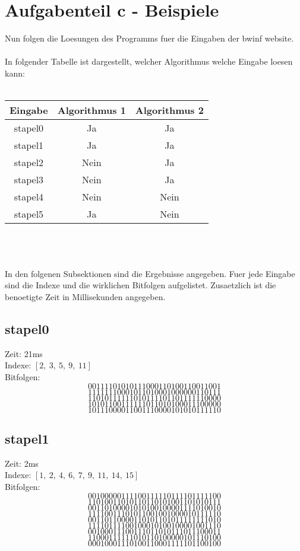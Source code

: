 \documentclass[a4paper,10pt,ngerman]{scrartcl}
\begin{document}
{\section{Aufgabenteil c - Beispiele}
Nun folgen die Loesungen des Programms fuer die Eingaben der bwinf website.\\
\\
In folgender Tabelle ist dargestellt, welcher Algorithmus welche Eingabe loesen kann:\\
\\
\begin{tabular}[c]{c|c|c}
Eingabe & Algorithmus 1 & Algorithmus 2 \\
\hline
stapel0 & Ja & Ja \\
stapel1 & Ja & Ja \\ 
stapel2 & Nein & Ja \\
stapel3 & Nein & Ja \\
stapel4 & Nein & Nein \\
stapel5 & Ja & Nein \\
\end{tabular}
\\\\\\
In den folgenen Subsektionen sind die Ergebnisse angegeben. Fuer jede Eingabe sind die Indexe und die wirklichen Bitfolgen aufgelistet. Zusaetzlich ist die benoetigte Zeit in Millisekunden angegeben.

\subsection{stapel0}
Zeit: 21ms\\
Indexe: $[2, \ 3, \ 5, \ 9, \ 11]$ \\
Bitfolgen:
$$
00111101010111000110100110011001
$$
$$
11111110001011010001000000110111
$$
$$
11010111111010111101101111110000
$$
$$
10101100111111011010100011100000
$$
$$
10111000011001110000101010111110
$$

\subsection{stapel1}
Zeit: 2ms \\
Indexe: $[1, \ 2,\  4, \ 6, \ 7, \ 9, \ 11, \ 14, \ 15]$ \\
Bitfolgen:
$$
00100000111100111110111101111100
$$
$$
11010011010110110101001101010111
$$
$$
00110100001010100100001111010010
$$
$$
11110011101011001001000010111110
$$
$$
00110110000110101101011111111010
$$
$$
11110111100100010100100001001110
$$
$$
00100011100111011010111011100011
$$
$$
11000111111010110100000101110100
$$
$$
00010001110100110001111101100100
$$

}
\end{document}
